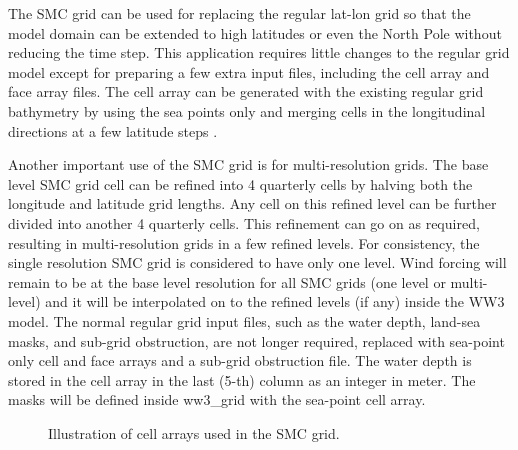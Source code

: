 The SMC grid can be used for replacing the regular lat-lon grid so that the
model domain can be extended to high latitudes or even the North Pole without
reducing the time step. This application requires little changes to the
regular grid model except for preparing a few extra input files, including the
cell array and face array files. The cell array can be generated with the
existing regular grid bathymetry by using the sea points only and merging
cells in the longitudinal directions at a few latitude steps \citep{art:Li11}.

Another important use of the SMC grid is for multi-resolution grids.
The base level SMC grid cell can be refined into 4 quarterly cells
by halving both the longitude and latitude grid lengths. Any cell
on this refined level can be further divided into another 4 quarterly
cells. This refinement can go on as required, resulting in multi-resolution
grids in a few refined levels. For consistency, the single resolution
SMC grid is considered to have only one level. Wind forcing will remain
to be at the base level resolution for all SMC grids (one level or
multi-level) and it will be interpolated on to the refined levels
(if any) inside the WW3 model. The normal regular grid input files,
such as the water depth, land-sea masks, and sub-grid obstruction,
are not longer required, replaced with sea-point only cell and face arrays
and a sub-grid obstruction file.  The water depth is stored in the cell array 
in the last (5-th) column as an integer in meter.  The masks will be defined  
inside ww3\_grid with the sea-point cell array.

\begin{figure}
\centerline{}
\caption{Illustration of cell arrays used in the SMC grid.}
\label{fig:SMCells} \botline
\end{figure}

